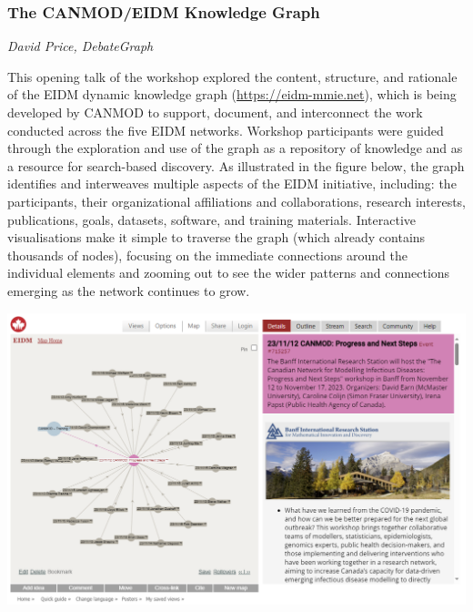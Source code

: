 \subsubsection*{The CANMOD/EIDM Knowledge Graph}
\textit{David Price, DebateGraph}

This opening talk of the workshop explored the content, structure, and rationale of the EIDM dynamic knowledge graph (\url{https://eidm-mmie.net}), which is being developed by CANMOD to support, document, and interconnect the work conducted across the five EIDM networks. Workshop participants were guided through the exploration and use of the graph as a repository of knowledge and as a resource for search-based discovery. As illustrated in the figure below, the graph identifies and interweaves multiple aspects of the EIDM initiative, including: the participants, their organizational affiliations and collaborations, research interests, publications, goals, datasets, software, and training materials. Interactive visualisations make it simple to traverse the graph (which already contains thousands of nodes), focusing on the immediate connections around the individual elements and zooming out to see the wider patterns and connections emerging as the network continues to grow.

\begin{center}
\includegraphics[width=\textwidth]{talk_summaries/EIDM_CANMOD.png}
\end{center}
